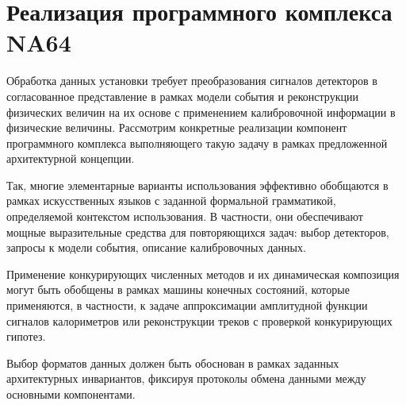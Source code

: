 \chapter{Реализация программного комплекса NA64}

Обработка данных установки требует преобразования
сигналов детекторов в согласованное представление в
рамках модели события и реконструкции физических величин
на их основе с применением калибровочной информации в
физические величины. Рассмотрим конкретные реализации
компонент программного комплекса выполняющего такую задачу
в рамках предложенной архитектурной концепции.

Так, многие элементарные варианты использования эффективно обобщаются
в рамках искусственных языков с заданной формальной грамматикой,
определяемой контекстом использования. В частности, они обеспечивают мощные
выразительные средства для повторяющихся задач:
выбор детекторов, запросы к модели события, описание калибровочных
данных.

Применение конкурирующих численных методов и их динамическая композиция
могут быть обобщены в рамках машины конечных состояний, которые применяются,
в частности, к задаче аппроксимации амплитудной функции сигналов калориметров
или реконструкции треков с проверкой конкурирующих гипотез.

Выбор форматов данных должен быть обоснован в рамках заданных
архитектурных инвариантов, фиксируя протоколы обмена данными между
основными компонентами.





